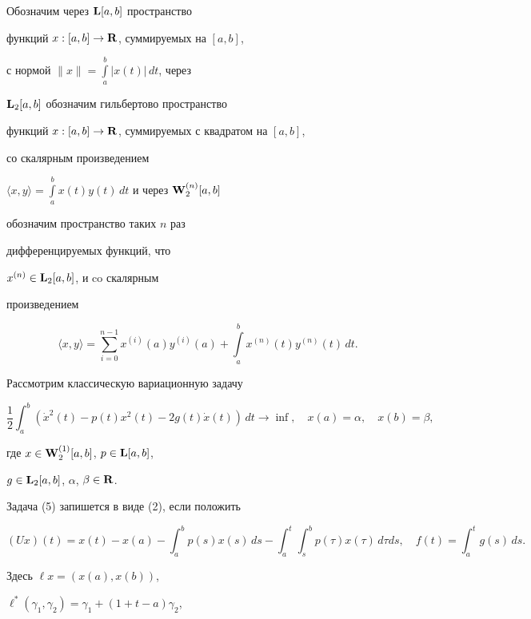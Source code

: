 Обозначим через $\bold L[a,b]$ пространство


функций $x:[a,b]\to\bold R$, суммируемых на $[a,b]$,


с нормой $\|x\|=\int\limits_a^b|x(t)|\,dt$, через


$\bold L_2[a,b]$ обозначим гильбертово пространство


функций $x:[a,b]\to\bold R$, суммируемых с квадратом на $[a,b]$,


со скалярным произведением


$\langle x,y\rangle=


\int\limits_a^bx(t)y(t)\,dt$ и через $\spc{W}_2^{(n)}[a,b]$


обозначим пространство таких $n$ раз


дифференцируемых функций, что


$x^{(n)}\in\bold L_2[a,b]$, и co скалярным


произведением


$$


\langle x,y\rangle=\sum\limits_{i=0}^{n-1}x^{(i)}(a)y^{(i)}(a)+


\int\limits_a^bx^{(n)}(t)y^{(n)}(t)\,dt.


$$





Рассмотрим классическую вариационную задачу


\begin{equation}


\frac12\int_a^b(\dot x^{2}(t)-p(t)x^{2}(t)-2g(t)\dot x(t))\,dt


\longrightarrow\inf,\quad


x(a)=\alpha,\quad x(b)=\beta,


\end{equation}


где $x\in\bold W^{(1)}_2[a,b]$, $p\in\bold L[a,b]$,


$g\in\bold L_2[a,b]$, $\alpha$, $\beta\in\bold R$.


Задача (5) запишется в виде (2), если положить


$$


(Ux)(t)=x(t)-x(a)-\int_a^bp(s)x(s)\,ds-


\int_a^t\int_s^bp(\tau)x(\tau)\,d\tau ds,\quad


f(t)=\int_a^tg(s)\,ds.


$$


Здесь $\ell x=(x(a),x(b))$,


$\ell^*(\gamma_1,\gamma_2)=\gamma_1+(1+t-a)\gamma_2$,


